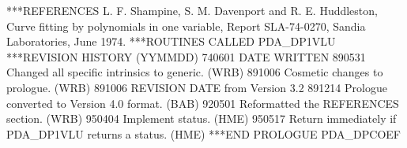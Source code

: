 \documentclass[11pt,twoside,nolof]{starlink}
\begin{document}
\begin{terminalv}
***REFERENCES  L. F. Shampine, S. M. Davenport and R. E. Huddleston,
                 Curve fitting by polynomials in one variable, Report
                 SLA-74-0270, Sandia Laboratories, June 1974.
***ROUTINES CALLED  PDA_DP1VLU
***REVISION HISTORY  (YYMMDD)
   740601  DATE WRITTEN
   890531  Changed all specific intrinsics to generic.  (WRB)
   891006  Cosmetic changes to prologue.  (WRB)
   891006  REVISION DATE from Version 3.2
   891214  Prologue converted to Version 4.0 format.  (BAB)
   920501  Reformatted the REFERENCES section.  (WRB)
   950404  Implement status.  (HME)
   950517  Return immediately if PDA_DP1VLU returns a status.  (HME)
***END PROLOGUE  PDA_DPCOEF
\end{terminalv}


\end{document}
